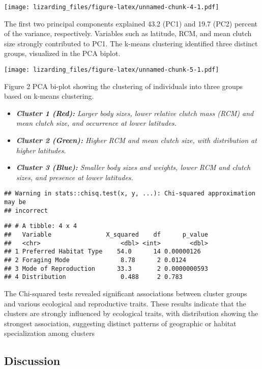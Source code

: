\documentclass[
]{article}
\providecommand{\tightlist}{%
  \setlength{\itemsep}{0pt}\setlength{\parskip}{0pt}}
\begin{document}
\texttt{[image: lizarding\_files/figure-latex/unnamed-chunk-4-1.pdf]}

The first two principal components explained 43.2 (PC1) and 19.7 (PC2)
percent of the variance, respectively. Variables such as latitude, RCM,
and mean clutch size strongly contributed to PC1. The k-means clustering
identified three distinct groups, visualized in the PCA biplot.

\texttt{[image: lizarding\_files/figure-latex/unnamed-chunk-5-1.pdf]}

Figure 2 PCA bi-plot showing the clustering of individuals into three
groups based on k-means clustering.

\begin{itemize}
\tightlist
\item
  \emph{\textbf{Cluster 1 (Red):} Larger body sizes, lower relative
  clutch mass (RCM) and mean clutch size, and occurrence at lower
  latitudes.}
\item
  \emph{\textbf{Cluster 2 (Green):} Higher RCM and mean clutch size,
  with distribution at higher latitudes.}
\item
  \emph{\textbf{Cluster 3 (Blue):} Smaller body sizes and weights, lower
  RCM and clutch sizes, and presence at lower latitudes.}
\end{itemize}

\begin{verbatim}
## Warning in stats::chisq.test(x, y, ...): Chi-squared approximation may be
## incorrect
\end{verbatim}

\begin{verbatim}
## # A tibble: 4 x 4
##   Variable               X_squared    df      p_value
##   <chr>                      <dbl> <int>        <dbl>
## 1 Preferred Habitat Type    54.0      14 0.00000126  
## 2 Foraging Mode              8.78      2 0.0124      
## 3 Mode of Reproduction      33.3       2 0.0000000593
## 4 Distribution               0.488     2 0.783
\end{verbatim}

The Chi-squared tests revealed significant associations between cluster
groups and various ecological and reproductive traits. These results
indicate that the clusters are strongly influenced by ecological traits,
with distribution showing the strongest association, suggesting distinct
patterns of geographic or habitat specialization among clusters

\subsection{Discussion}\label{discussion}
\end{document}

